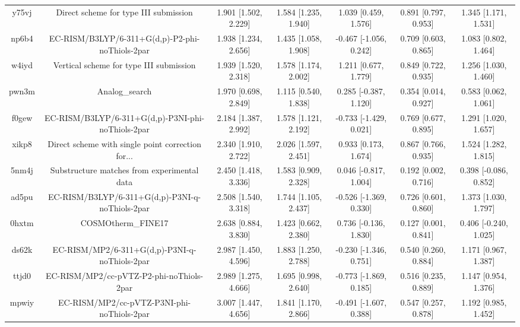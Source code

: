 \documentclass{article}
\begin{document}
\begin{center}
\begin{longtable}{|ccccccc|}
 y75vj &              Direct scheme for type III submission &  1.901 [1.502, 2.229] &  1.584 [1.235, 1.940] &     1.039 [0.459, 1.576] &  0.891 [0.797, 0.953] &   1.345 [1.171, 1.531] \\
 np6b4 &    EC-RISM/B3LYP/6-311+G(d,p)-P2-phi-noThiols-2par &  1.938 [1.234, 2.656] &  1.435 [1.058, 1.908] &   -0.467 [-1.056, 0.242] &  0.709 [0.603, 0.865] &   1.083 [0.802, 1.464] \\
 w4iyd &            Vertical scheme for type III submission &  1.939 [1.520, 2.318] &  1.578 [1.174, 2.002] &     1.211 [0.677, 1.779] &  0.849 [0.722, 0.935] &   1.256 [1.030, 1.460] \\
 pwn3m &                                     Analog\_search &  1.970 [0.698, 2.849] &  1.115 [0.540, 1.838] &    0.285 [-0.387, 1.120] &  0.354 [0.014, 0.927] &   0.583 [0.062, 1.061] \\
 f0gew &  EC-RISM/B3LYP/6-311+G(d,p)-P3NI-phi-noThiols-2par &  2.184 [1.387, 2.992] &  1.578 [1.121, 2.192] &   -0.733 [-1.429, 0.021] &  0.769 [0.677, 0.895] &   1.291 [1.020, 1.657] \\
 xikp8 &  Direct scheme with single point correction for... &  2.340 [1.910, 2.722] &  2.026 [1.597, 2.451] &     0.933 [0.173, 1.674] &  0.867 [0.766, 0.935] &   1.524 [1.282, 1.815] \\
 5nm4j &        Substructure matches from experimental data &  2.450 [1.418, 3.336] &  1.583 [0.909, 2.328] &    0.046 [-0.817, 1.004] &  0.192 [0.002, 0.716] &  0.398 [-0.086, 0.852] \\
 ad5pu &    EC-RISM/B3LYP/6-311+G(d,p)-P3NI-q-noThiols-2par &  2.508 [1.540, 3.318] &  1.744 [1.105, 2.437] &   -0.526 [-1.369, 0.330] &  0.726 [0.601, 0.860] &   1.373 [1.030, 1.797] \\
 0hxtm &                                 COSMOtherm\_FINE17 &  2.638 [0.884, 3.830] &  1.423 [0.662, 2.380] &    0.736 [-0.136, 1.830] &  0.127 [0.001, 0.841] &  0.406 [-0.240, 1.025] \\
 ds62k &      EC-RISM/MP2/6-311+G(d,p)-P3NI-q-noThiols-2par &  2.987 [1.450, 4.596] &  1.883 [1.250, 2.788] &   -0.230 [-1.346, 0.751] &  0.540 [0.260, 0.884] &   1.171 [0.967, 1.387] \\
 ttjd0 &           EC-RISM/MP2/cc-pVTZ-P2-phi-noThiols-2par &  2.989 [1.275, 4.666] &  1.695 [0.998, 2.640] &   -0.773 [-1.869, 0.185] &  0.516 [0.235, 0.889] &   1.147 [0.954, 1.376] \\
 mpwiy &         EC-RISM/MP2/cc-pVTZ-P3NI-phi-noThiols-2par &  3.007 [1.447, 4.656] &  1.841 [1.170, 2.866] &   -0.491 [-1.607, 0.388] &  0.547 [0.257, 0.878] &   1.192 [0.985, 1.452] \\

\end{longtable}
\end{center}
\end{document}
